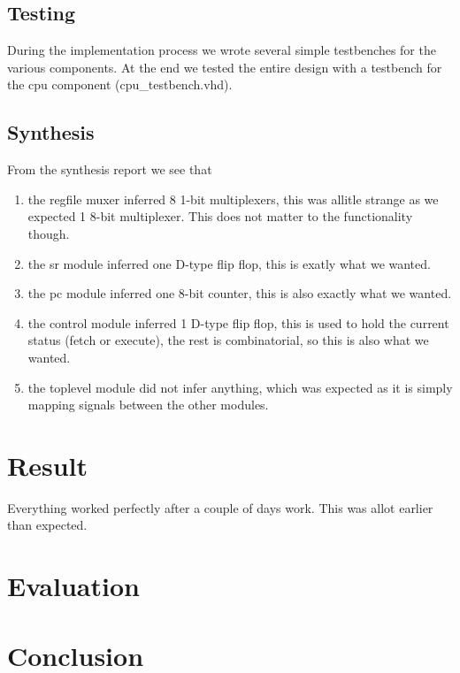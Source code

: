 \documentclass[10pt]{report}
\begin{document}
	\subsection*{Testing}

	During the implementation process we wrote several simple testbenches for the various components. At the end we tested the entire design with a testbench for the cpu component (cpu\_testbench.vhd).

	\subsection*{Synthesis}

	From the synthesis report we see that 
	\begin{enumerate}
		\item the regfile muxer inferred 8 1-bit multiplexers, this was allitle strange as we expected 1 8-bit multiplexer. This does not matter to the functionality though.
		\item the sr module inferred one D-type flip flop, this is exatly what we wanted.
		\item the pc module inferred one 8-bit counter, this is also exactly what we wanted.
		\item the control module inferred 1 D-type flip flop, this is used to hold the current status (fetch or execute), the rest is combinatorial, so this is also what we wanted.
		\item the toplevel module did not infer anything, which was expected as it is simply mapping signals between the other modules.
	\end{enumerate}

	\section*{Result}


	Everything worked perfectly after a couple of days work. This was allot earlier than expected.



	\section*{Evaluation}


	\section*{Conclusion}

\end{document}
